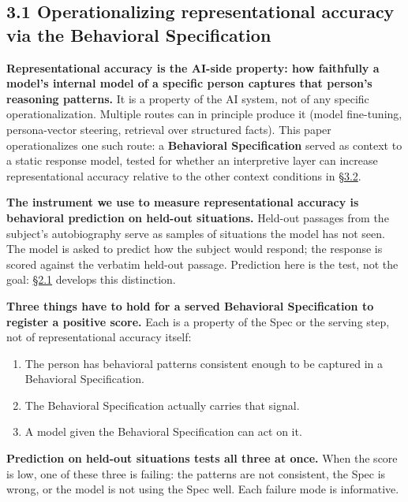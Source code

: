 \hypertarget{operationalizing-representational-accuracy-via-the-behavioral-specification}{%
\subsection{3.1 Operationalizing representational accuracy via the
Behavioral
Specification}\label{operationalizing-representational-accuracy-via-the-behavioral-specification}}

\textbf{Representational accuracy is the AI-side property: how
faithfully a model's internal model of a specific person captures that
person's reasoning patterns.} It is a property of the AI system, not of
any specific operationalization. Multiple routes can in principle
produce it (model fine-tuning, persona-vector steering, retrieval over
structured facts). This paper operationalizes one such route: a
\textbf{Behavioral Specification} served as context to a static response
model, tested for whether an interpretive layer can increase
representational accuracy relative to the other context conditions in
\hyperref[experimental-conditions]{§3.2}.

\textbf{The instrument we use to measure representational accuracy is
behavioral prediction on held-out situations.} Held-out passages from
the subject's autobiography serve as samples of situations the model has
not seen. The model is asked to predict how the subject would respond;
the response is scored against the verbatim held-out passage. Prediction
here is the test, not the goal: \hyperref[prior-measurement-targets-and-the-gap-representational-accuracy-fills]{§2.1} develops this distinction.

\textbf{Three things have to hold for a served Behavioral Specification
to register a positive score.} Each is a property of the Spec or the
serving step, not of representational accuracy itself:

\begin{enumerate}
\def\labelenumi{\arabic{enumi}.}
\tightlist
\item
  The person has behavioral patterns consistent enough to be captured in
  a Behavioral Specification.
\item
  The Behavioral Specification actually carries that signal.
\item
  A model given the Behavioral Specification can act on it.
\end{enumerate}

\textbf{Prediction on held-out situations tests all three at once.} When
the score is low, one of these three is failing: the patterns are not
consistent, the Spec is wrong, or the model is not using the Spec well.
Each failure mode is informative.


